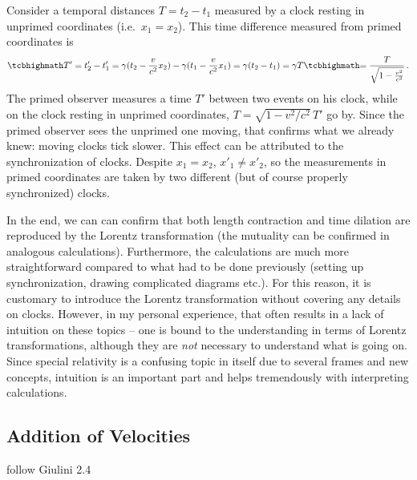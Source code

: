 
Consider a temporal distances $T = t_2 - t_1$ measured by a clock resting in unprimed coordinates (i.e.~$x_1 = x_2$). This time difference measured from primed coordinates is
\begin{equation}
	\eqbox{T'} = t'_2 - t'_1 = \gamma (t_2 - \frac{v}{c^2} x_2) - \gamma (t_1 - \frac{v}{c^2} x_1) = \gamma (t_2 - t_1) = \gamma T \eqbox{= \frac{T}{\sqrt{1 - \frac{v^2}{c^2}}}} \, .
\end{equation}
The primed observer measures a time $T'$ between two events on his clock, while on the clock resting in unprimed coordinates, $T = \sqrt{1 - v^2 / c^2} \, T'$ go by. Since the primed observer sees the unprimed one moving, that confirms what we already knew: moving clocks tick slower. This effect can be attributed to the synchronization of clocks. Despite $x_1 = x_2$, $x'_1 \neq x'_2$, so the measurements in primed coordinates are taken by two different (but of course properly synchronized) clocks.\\




In the end, we can can confirm that both length contraction and time dilation are reproduced by the Lorentz transformation (the mutuality can be confirmed in analogous calculations). Furthermore, the calculations are much more straightforward compared to what had to be done previously (setting up synchronization, drawing complicated diagrams etc.). For this reason, it is customary to introduce the Lorentz transformation without covering any details on clocks. However, in my personal experience, that often results in a lack of intuition on these topics -- one is bound to the understanding in terms of Lorentz transformations, although they are \emph{not} necessary to understand what is going on. Since special relativity is a confusing topic in itself due to several frames and new concepts, intuition is an important part and helps tremendously with interpreting calculations.



		\subsection{Addition of Velocities}

follow Giulini 2.4



